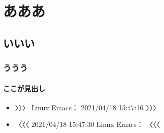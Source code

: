 \documentclass[
]{ltjarticle}
\author{}
\date{}
\begin{document}
{
\setcounter{tocdepth}{4}
\tableofcontents
}
\hypertarget{ux3042ux3042ux3042}{%
\section{あああ}\label{ux3042ux3042ux3042}}

\hypertarget{ux3044ux3044ux3044}{%
\subsection{いいい}\label{ux3044ux3044ux3044}}

\hypertarget{ux3046ux3046ux3046}{%
\subsubsection{ううう}\label{ux3046ux3046ux3046}}

\hypertarget{ux3053ux3053ux304cux898bux51faux3057}{%
\paragraph{ここが見出し}\label{ux3053ux3053ux304cux898bux51faux3057}}

\begin{itemize}
\item
  〉〉〉 Linux Emacs： 2021/04/18 15:47:16 〉〉〉
\item
  〈〈〈 2021/04/18 15:47:30 Linux Emacs： 〈〈〈
\end{itemize}
\end{document}
